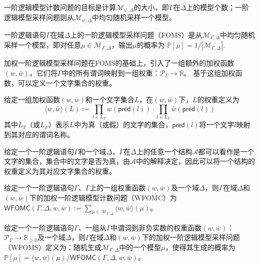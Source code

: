 \documentclass[12pt,UTF8,AutoFakeBold=3,a4paper]{ctexart} %
\newcommand{\sentence}{\Gamma}
\newcommand{\formula}{\psi}
\newcommand{\weight}{w}
\newcommand{\negweight}{\bar{w}}
\newcommand{\wfomc}{WFOMC}
\newcommand{\symwfomc}{\ensuremath{\mathsf{WFOMC}}}
\newcommand{\domain}{\Delta}
\newcommand{\real}{\mathbb{R}}
\newcommand{\pro}{\mathbb{P}}
\newcommand{\fomodels}[2]{\mathcal{M}_{#1, #2}}
\newcommand{\structure}{\mathcal{A}}
\newcommand{\typeweight}[1]{\langle \weight, \negweight\rangle(#1)}
\begin{document}
一阶逻辑模型计数问题的目标是计算$\fomodels{\formula}{\domain}$的大小，即$\sentence$在$\domain$上的模型个数；一阶逻辑模型采样问题则从$\fomodels{\formula}{\domain}$中均匀随机采样一个模型。

\begin{definition}
	一阶逻辑语句$\sentence$在域$\domain$上的一阶逻辑模型采样问题（FOMS）是从$\fomodels{\sentence}{\domain}$中均匀随机采样一个模型，即对任意$\mu\in\fomodels{\sentence}{\domain}$，输出$\mu$的概率为 $\pro[\mu]=1/|\fomodels{\sentence}{\domain}|$.
\end{definition}
加权一阶逻辑模型采样问题在FOMS的基础上，引入了一组额外的加权函数$(\weight, \negweight)$，它们将$\sentence$中的所有谓词映射到一组权重：$\mathcal{P}_\sentence \to \real$。
基于这组加权函数，可以定义一个文字集合的权重。
\begin{definition}[文字集合的权重]
	\label{def:weight-of-literals}
	给定一组加权函数$(\weight, \negweight)$和一个文字集合$L$，在$(\weight, \negweight)$下，$L$的权重定义为
	\begin{equation}
		\typeweight{L} := \prod_{l\in L_T}\weight(\mathsf{pred}(l)) \cdot \prod_{l\in L_F}\negweight(\mathsf{pred}(l))
	\end{equation}
其中$L_T$（或$L_F$）表示$L$中为真（或假）的文字的集合，$\mathsf{pred}(l)$将一个文字$l$映射到其对应的谓词名称。
\end{definition}

给定一个一阶逻辑语句$\sentence$和一个域$\domain$，$\sentence$在$\domain$上的任意一个结构$\structure$都可以看作是一个文字的集合，集合中的文字是否为真，由$\structure$中的解释决定，因此可以将一个结构的权重定义为其对应文字集合的权重。

\begin{definition}\label{def:wfomc}
	给定一个一阶逻辑语句$\sentence$、$\sentence$上的一组权重函数$(\weight, \negweight)$及一个域$\domain$，则$\sentence$在域$\domain$和$(\weight, \negweight)$下的加权一阶逻辑模型计数问题（\wfomc）为$\symwfomc(\sentence, \domain, \weight, \negweight) := \sum_{\mu\in\fomodels{\sentence}{\domain}}\typeweight{\mu}$。
\end{definition}
\begin{definition}
\label{def:wfoms}
	给定一个一阶逻辑语句$\sentence$、一组从$\sentence$中谓词到非负实数的权重函数$(\weight, \negweight)$：$\mathcal{P}_\sentence\to\real_{\ge 0}$及一个域$\domain$，则$\sentence$在域$\domain$和$(\weight, \negweight)$下的加权一阶逻辑模型采样问题（WFOMS）定义为：随机生成$\fomodels{\sentence}{\domain}$中的一个模型$\mu$，使得其生成的概率为$\pro[\mu] = \typeweight{\mu}/\symwfomc(\sentence, \domain, \weight, \negweight)$。
\end{definition}
\end{document}
